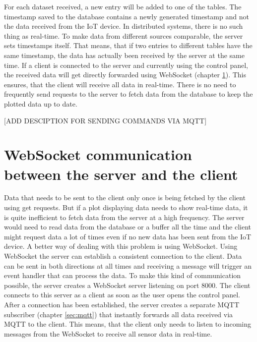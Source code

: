 For each dataset received, a new entry will be added to one of the tables.  The timestamp saved to the database contains a newly generated timestamp and not the data received from the IoT device. In distributed systems, there is no such thing as real-time. To make data from different sources comparable, the server sets timestamps itself. That means, that if two entries to different tables have the same timestamp,  the data has actually been received by the server at the same time. If a client is connected to the server and currently using the control panel, the received data will get directly forwarded using WebSocket (chapter \ref{sec:websocket}). This ensures, that the client will receive all data in real-time. There is no need to frequently send requests to the server to fetch data from the database to keep the plotted data up to date.

[ADD DESCIPTION FOR SENDING COMMANDS VIA MQTT]



\section{WebSocket communication between the server and the client}
\label{sec:websocket}
Data that needs to be sent to the client only once is being fetched by the client using get requests. But if a plot displaying data needs to show real-time data, it is quite inefficient to fetch data from the server at a high frequency. The server would need to read data from the database or a buffer all the time and the client might request data a lot of times even if no new data has been sent from the IoT device.
A better way of dealing with this problem is using WebSocket. Using WebSocket the server can establish a consistent connection to the client. Data can be sent in both directions at all times and receiving a message will trigger an event handler that can process the data. To make this kind of communication possible, the server creates a WebSocket server listening on port 8000. The client connects to this server as a client as soon as the user opens the control panel. After a connection has been established, the server creates a separate MQTT subscriber (chapter \ref{sec:mqtt}) that instantly forwards all data received via MQTT to the client. This means, that the client only needs to listen to incoming messages from the WebSocket to receive all sensor data in real-time.



